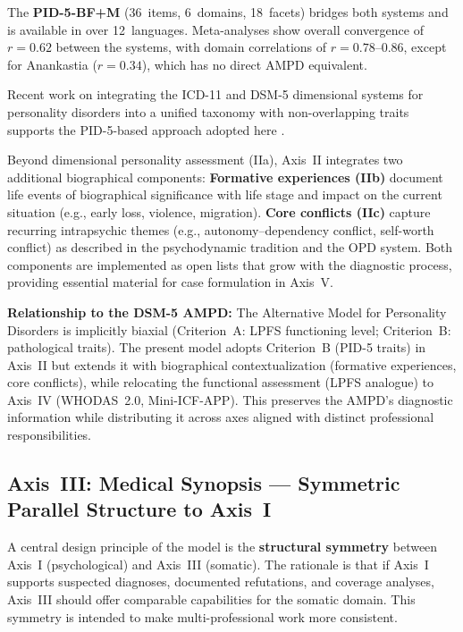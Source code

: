 \documentclass[11pt,a4paper]{article}
\begin{document}
The \textbf{PID-5-BF+M} (36~items, 6~domains, 18~facets) bridges both systems and is available in over 12~languages. Meta-analyses show overall convergence of $r = 0.62$ between the systems, with domain correlations of $r = 0.78$--$0.86$, except for Anankastia ($r = 0.34$), which has no direct AMPD equivalent.

Recent work on integrating the ICD-11 and DSM-5 dimensional systems for personality disorders into a unified taxonomy with non-overlapping traits supports the PID-5-based approach adopted here \citep{Bach2022}.

Beyond dimensional personality assessment (IIa), Axis~II integrates two additional biographical components: \textbf{Formative experiences (IIb)} document life events of biographical significance with life stage and impact on the current situation (e.g., early loss, violence, migration). \textbf{Core conflicts (IIc)} capture recurring intrapsychic themes (e.g., autonomy--dependency conflict, self-worth conflict) as described in the psychodynamic tradition and the OPD system. Both components are implemented as open lists that grow with the diagnostic process, providing essential material for case formulation in Axis~V.

\textbf{Relationship to the DSM-5 AMPD:} The Alternative Model for Personality Disorders is implicitly biaxial (Criterion~A: LPFS functioning level; Criterion~B: pathological traits). The present model adopts Criterion~B (PID-5 traits) in Axis~II but extends it with biographical contextualization (formative experiences, core conflicts), while relocating the functional assessment (LPFS analogue) to Axis~IV (WHODAS~2.0, Mini-ICF-APP). This preserves the AMPD's diagnostic information while distributing it across axes aligned with distinct professional responsibilities.

\subsection{Axis~III: Medical Synopsis --- Symmetric Parallel Structure to Axis~I}
\label{sec:axis3}

A central design principle of the model is the \textbf{structural symmetry} between Axis~I (psychological) and Axis~III (somatic). The rationale is that if Axis~I supports suspected diagnoses, documented refutations, and coverage analyses, Axis~III should offer comparable capabilities for the somatic domain. This symmetry is intended to make multi-professional work more consistent.
\end{document}
